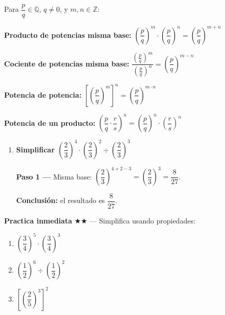 \documentclass[11pt, letterpaper]{article}
\begin{document}
\begin{tcolorbox}[importantbox, title={Propiedades heredadas (Gu\'ia 1)}]
Para $\dfrac{p}{q} \in \mathbb{Q}$, $q\neq0$, y $m,n\in\mathbb{Z}$:

\medskip

\noindent\textbf{Producto de potencias misma base:} $\left(\dfrac{p}{q}\right)^m \cdot \left(\dfrac{p}{q}\right)^n = \left(\dfrac{p}{q}\right)^{m+n}$

\medskip

\noindent\textbf{Cociente de potencias misma base:} $\dfrac{\left(\frac{p}{q}\right)^m}{\left(\frac{p}{q}\right)^n} = \left(\dfrac{p}{q}\right)^{m-n}$

\medskip

\noindent\textbf{Potencia de potencia:} $\left[\left(\dfrac{p}{q}\right)^m\right]^n = \left(\dfrac{p}{q}\right)^{m\cdot n}$

\medskip

\noindent\textbf{Potencia de un producto:} $\left(\dfrac{p}{q} \cdot \dfrac{r}{s}\right)^n = \left(\dfrac{p}{q}\right)^n \cdot \left(\dfrac{r}{s}\right)^n$
\end{tcolorbox}

\begin{tcolorbox}[examplebox, title={Ejemplo --- aplicar propiedades}]
\begin{enumerate}[label=\textbf{Ej. \arabic*.}, leftmargin=*, itemsep=12pt]

\item \textbf{Simplificar $\left(\dfrac{2}{3}\right)^4 \cdot \left(\dfrac{2}{3}\right)^2 \div \left(\dfrac{2}{3}\right)^3$}

\textbf{Paso 1 ---} Misma base: $\left(\dfrac{2}{3}\right)^{4+2-3} = \left(\dfrac{2}{3}\right)^{3} = \dfrac{8}{27}$.

\textbf{Conclusi\'on:} el resultado es $\dfrac{8}{27}$. \checkmark

\end{enumerate}
\end{tcolorbox}

\medskip
\textbf{Practica inmediata} \quad $\bigstar\bigstar$ --- Simplifica usando propiedades:
\begin{enumerate}[label=\alph*), leftmargin=*]
  \item $\left(\dfrac{3}{4}\right)^5 \cdot \left(\dfrac{3}{4}\right)^3$
  \item $\left(\dfrac{1}{2}\right)^6 \div \left(\dfrac{1}{2}\right)^2$
  \item $\left[\left(\dfrac{2}{5}\right)^3\right]^2$
\end{enumerate}
\end{document}

